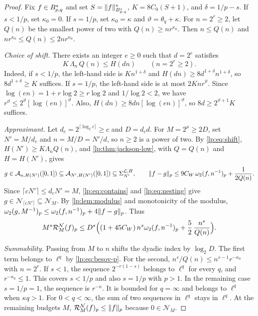 \documentclass[11pt,a4paper]{article}
\begin{document}
\begin{proof}
Fix $f\in B^{s}_{p,q}$ and set $S=\|f\|^*_{B^{s}_{p,q}}$, $K=8C_0(S+1)$, and $\delta=1/p-s$. If $s<1/p$, set $\kappa_0=0$. If $s=1/p$, set $\kappa_0=\kappa$ and $\vartheta=\theta_q+\kappa$. For $n=2^r\ge2$, let $Q(n)$ be the smallest power of two with $Q(n)\ge nr^{\kappa_0}$. Then $n\le Q(n)$ and $nr^{\kappa_0}\le Q(n)\le2nr^{\kappa_0}$.

\emph{Choice of shift.} There exists an integer $e\ge0$ such that $d=2^e$ satisfies
\begin{equation}
 K\,\Lambda_n\,Q(n)\le H(dn)\qquad(n=2^r\ge2).
 \label{lp:eq:shift}
\end{equation}
Indeed, if $s<1/p$, the left-hand side is $Kn^{1+\delta}$ and $H(dn)\ge8d^{1+\delta}n^{1+\delta}$, so $8d^{1+\delta}\ge K$ suffices. If $s=1/p$, the left-hand side is at most $2Knr^{\vartheta}$. Since $\log(en)=1+r\log2\ge r\log2$ and $1/\log2<2$, we have $r^\vartheta\le2^\vartheta[\log(en)]^\vartheta$. Also, $H(dn)\ge8dn[\log(en)]^\vartheta$, so $8d\ge2^{\vartheta+1}K$ suffices.

\emph{Approximant.} Let $d_c=2^{\lceil\log_2c\rceil}\ge c$ and $D=d_cd$. For $M=2^\mu\ge2D$, set $N'=M/d_c$ and $n=M/D=N'/d$, so $n\ge2$ is a power of two. By \eqref{lp:eq:shift}, $H(N')\ge K\Lambda_nQ(n)$, and \cref{lp:thm:jackson-low}, with $Q=Q(n)$ and $H=H(N')$, gives
\[
 g\in\mathcal A_{n,H(N')}([0,1])\subseteq\mathcal A_{N',H(N')}([0,1])\subseteq\Sigma_{N'}^{\mathcal L,H},
 \qquad
 \|f-g\|_p\le9C_W\,\omega_2(f,n^{-1})_{p}+\frac1{2Q(n)} .
\]
Since $\lceil cN'\rceil\le d_cN'=M$, \eqref{lp:eq:contains} and \eqref{lp:eq:nesting} give $g\in\mathcal N_{\lceil cN'\rceil}\subseteq\mathcal N_M$. By \cref{lp:lem:modulus} and monotonicity of the modulus, $\omega_2(g,M^{-1})_{p}\le\omega_2(f,n^{-1})_{p}+4\|f-g\|_p$. Thus
\[
 M^s\mathcal R^{\mathcal N}_{M}(f)_p
 \le D^s\Bigl((1+45C_W)\,n^s\omega_2(f,n^{-1})_{p}+\frac52\,\frac{n^s}{Q(n)}\Bigr).
\]

\emph{Summability.} Passing from $M$ to $n$ shifts the dyadic index by $\log_2D$. The first term belongs to $\ell^q$ by \eqref{lp:eq:besov-p}. For the second, $n^s/Q(n)\le n^{s-1}r^{-\kappa_0}$ with $n=2^r$. If $s<1$, the sequence $2^{-r(1-s)}$ belongs to $\ell^q$ for every $q$, and $r^{-\kappa_0}\le1$. This covers $s<1/p$ and also $s=1/p$ with $p>1$. In the remaining case $s=1/p=1$, the sequence is $r^{-\kappa}$. It is bounded for $q=\infty$ and belongs to $\ell^q$ when $\kappa q>1$. For $0<q<\infty$, the sum of two sequences in $\ell^q$ stays in $\ell^q$. At the remaining budgets $M$, $\mathcal R^{\mathcal N}_{M}(f)_p\le\|f\|_p$ because $0\in\mathcal N_M$.
\end{proof}
\end{document}
